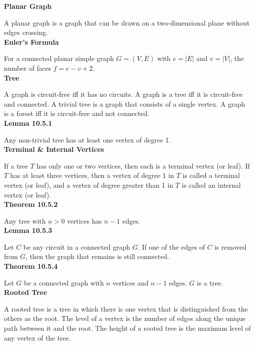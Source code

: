 \documentclass[a4paper]{article}
\newcommand{\subheading}[1]{{\scriptsize\textbf{#1}}}
\begin{document}
\begin{multicols*}{4}
\subheading{Planar Graph}

A planar graph is a graph that can be drawn on a two-dimensional plane without
edges crossing.\\

\subheading{Euler's Formula}

For a connected planar simple graph $G = (V, E)$ with $e = |E|$ and $v = |V|$,
the number of faces $f = e - v + 2$.\\

\subheading{Tree}

A graph is circuit-free iff it has no circuits. A graph is a tree iff it is
circuit-free and connected. A trivial tree is a graph that consists of a single
vertex. A graph is a forest iff it is circuit-free and not connected.\\

\subheading{Lemma 10.5.1}

Any non-trivial tree has at least one vertex of degree 1.\\

\subheading{Terminal \& Internal Vertices}

If a tree $T$ has only one or two vertices, then each is a terminal vertex (or
leaf). If $T$ has at least three vertices, then a vertex of degree 1 in $T$ is
called a terminal vertex (or leaf), and a vertex of degree greater than 1 in $T$
is called an internal vertex (or leaf).\\

\subheading{Theorem 10.5.2}

Any tree with $n > 0$ vertices has $n - 1$ edges.\\

\subheading{Lemma 10.5.3}

Let $C$ be any circuit in a connected graph $G$. If one of the edges of $C$ is
removed from $G$, then the graph that remains is still connected. \\

\subheading{Theorem 10.5.4}

Let $G$ be a connected graph with $n$ vertices and $n-1$ edges. $G$ is a tree.\\

\subheading{Rooted Tree}

A rooted tree is a tree in which there is one vertex that is distinguished from
the others as the root. The level of a vertex is the number of edges along the
unique path between it and the root. The height of a rooted tree is the maximum
level of any vertex of the tree.\\


\end{multicols*}
\end{document}
